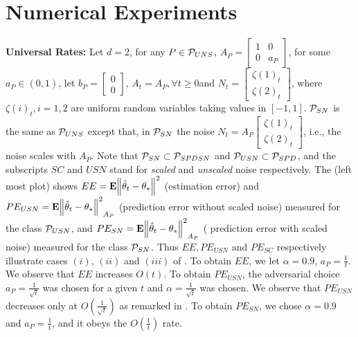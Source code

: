\section{Numerical Experiments}\label{sec:exp}

\textbf{Universal Rates:} Let $d=2$, for any $P\in \P_{UNS}$, $A_P=\left[\begin{matrix}1 &0\\ 0 & a_P\end{matrix}\right]$, for some $a_P\in (0,1)$, let $b_P=\left[\begin{matrix}0\\0\end{matrix}\right]$, $A_t=A_P,\forall t\geq 0$and $N_t=\left[\begin{matrix}\zeta(1)_t\\ \zeta(2)_t\end{matrix}\right]$, where $\zeta(i)_t, i=1,2$ are \iid uniform random variables taking values in $[-1,1]$. $\P_{SN}$ is the same as $\P_{UNS}$ except that, in $\P_{SN}$ the noise $N_t=A_P \left[\begin{matrix}\zeta(1)_t\\ \zeta(2)_t\end{matrix}\right]$, i.e., the noise scales with $A_P$. Note that $\P_{SN}\subset \P_{SPDSN}$ and $\P_{USN}\subset \P_{SPD}$, and the subscripts $SC$ and $USN$ stand for \emph{scaled} and \emph{unscaled} noise respectively. 
The  (left most plot) shows $EE=\E{\norm{\thh_t-\ts}^2}$ (estimation error) and $PE_{USN}=\E{\norm{\thh_t-\ts}^2}_{A_P}$ (prediction error without scaled noise) measured for the class $\P_{USN}$,  and $PE_{SN}=\E{\norm{\thh_t-\ts}^2}_{A_P}$ ( prediction error with scaled noise)  measured for the class $\P_{SN}$. Thus $EE, PE_{USN}$ and $PE_{SC}$ respectively illustrate cases $(i)$, $(ii)$ and $(iii)$ of . To obtain $EE$, we let $\alpha=0.9$, $a_P=\frac{1}{t}$. We observe that $EE$ increases $O(t)$. To obtain $PE_{USN}$, the adversarial choice $a_P=\frac{1}{\sqrt{t}}$ was chosen for a given $t$ and $\alpha=\frac{1}{\sqrt{t}}$ was chosen. We observe that $PE_{USN}$ decreases only at $O(\frac{1}{\sqrt{t}})$ as remarked in . To obtain $PE_{SN}$, we chose $\alpha=0.9$ and $a_P=\frac{1}{t}$, and it obeys the $O(\frac{1}{t})$ rate.

